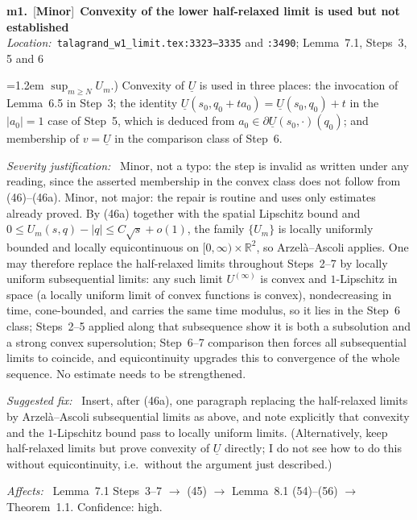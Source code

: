 \documentclass[11pt]{article}
\newcommand{\sevMin}{\textcolor{Goldenrod!60!black}{\textbf{Minor}}}
\newenvironment{finding}[4]{%
  \par\medskip\noindent
  \textbf{#1.}~[#2]~\textbf{#4}\\
  \noindent\textit{Location:}~#3\par\nopagebreak\begin{list}{}{\leftmargin=1.2em\itemsep=2pt\parsep=0pt}}%
  {\end{list}\medskip}
\newcommand{\field}[1]{\item[]\textit{#1:}~}
\newcommand{\R}{\mathbb{R}}
\begin{document}
\begin{finding}{m1}{\sevMin}{\texttt{talagrand\_w1\_limit.tex:3323--3335} and \texttt{:3490}; Lemma~7.1, Steps~3, 5 and 6}{Convexity of the lower half-relaxed limit is used but not established}
  $\sup_{m\ge N}U_m$.) Convexity of $\underline U$ is used in three places: the invocation of
  Lemma~6.5 in Step~3; the identity $\underline U(s_0,q_0+ta_0)=\underline U(s_0,q_0)+t$ in the
  $|a_0|=1$ case of Step~5, which is deduced from $a_0\in\partial\underline U(s_0,\cdot)(q_0)$;
  and membership of $v=\underline U$ in the comparison class of Step~6.
  \field{Severity justification} Minor, not a typo: the step is invalid as written under any
  reading, since the asserted membership in the convex class does not follow from
  (46)--(46a). Minor, not major: the repair is routine and uses only estimates already proved.
  By (46a) together with the spatial Lipschitz bound and $0\le U_m(s,q)-|q|\le C\sqrt s+o(1)$,
  the family $\{U_m\}$ is locally uniformly bounded and locally equicontinuous on
  $[0,\infty)\times\R^2$, so Arzel\`a--Ascoli applies. One may therefore replace the
  half-relaxed limits throughout Steps~2--7 by locally uniform subsequential limits: any such
  limit $U^{(\infty)}$ is convex and $1$-Lipschitz in space (a locally uniform limit of convex
  functions is convex), nondecreasing in time, cone-bounded, and carries the same time modulus,
  so it lies in the Step~6 class; Steps~2--5 applied along that subsequence show it is both a
  subsolution and a strong convex supersolution; Step~6--7 comparison then forces all
  subsequential limits to coincide, and equicontinuity upgrades this to convergence of the whole
  sequence. No estimate needs to be strengthened.
  \field{Suggested fix} Insert, after (46a), one paragraph replacing the half-relaxed limits by
  Arzel\`a--Ascoli subsequential limits as above, and note explicitly that convexity and the
  $1$-Lipschitz bound pass to locally uniform limits. (Alternatively, keep half-relaxed limits
  but prove convexity of $\underline U$ directly; I do not see how to do this without
  equicontinuity, i.e.\ without the argument just described.)
  \field{Affects} Lemma~7.1 Steps~3--7 $\to$ (45) $\to$ Lemma~8.1 (54)--(56) $\to$
  Theorem~1.1. Confidence: high.
\end{finding}
\end{document}
